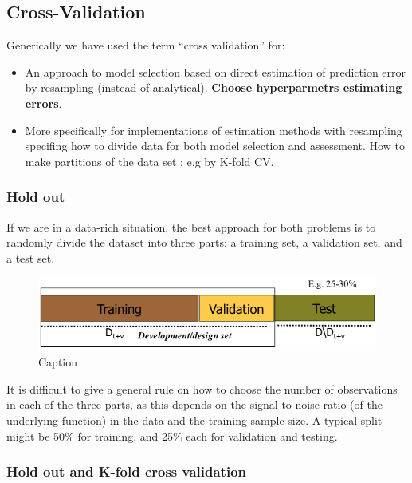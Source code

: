 \documentclass[../main.tex]{subfiles}
\begin{document}
\subsection{Cross-Validation}
Generically we have used the term “cross validation” for:
\begin{itemize}
    \item An approach to model selection based on direct estimation of prediction error by resampling (instead of analytical). \textbf{Choose hyperparmetrs estimating errors}.
    
    \item More specifically for implementations of estimation methods with resampling specifing how to divide data for both model selection and assessment. How to make partitions of the data set : e.g by K-fold CV.
\end{itemize}
\subsubsection{Hold out}
If we are in a data-rich situation, the best approach for both problems is to randomly divide the dataset into three parts: a training set, a validation set, and a test set. 
\begin{figure}[H]
    \centering
    \includegraphics[scale = 0.4]{lectures/1_Introduction/intro_cross_valid.png}
    \caption{Caption}
    \label{fig:5_cross_valid}
\end{figure}
It is difficult to give a general rule on how to choose the number of observations in each of the three parts, as this depends on the signal-to-noise ratio (of the underlying
function) in the data and the training sample size. A typical split might be 50\% for training, and 25\% each for validation and testing.\\

\subsubsection{Hold out and K-fold cross validation}
\end{document}
